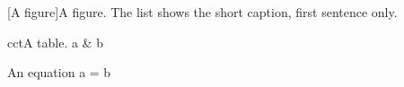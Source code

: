 \documentclass[paths={code=code/}]{myreport}
\begin{document}
\begin{demosyntax}
\mylistoffigures[<label>]     %
\mylistoftables[<label>]      %
\mylistofprograms[<label>]    %
\mylistofequations[<label>]   %
\end{demosyntax}
\begin{demo}
\mytableofcontents
\mylistoffigures
\mylistoftables
\mylistofprograms
\mylistofequations
\end{demo}
[A figure]{A figure. The list shows the
short caption, first sentence only.}
\begin{mytable}{cc}{t}{A table.}
  a & b \\
\end{mytable}
\begin{myequation}[e]{An equation}
  a = b
\end{myequation}
\end{document}

